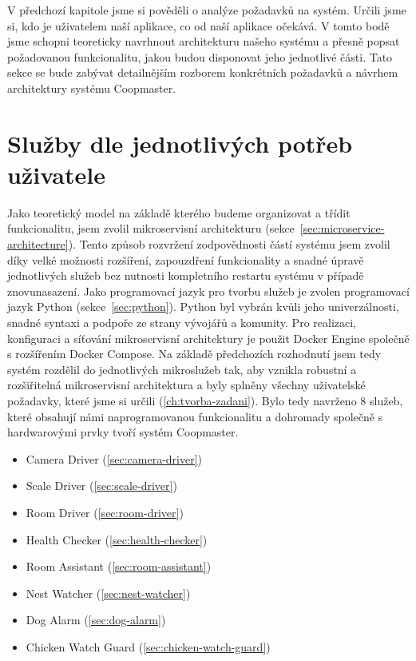V předchozí kapitole jsme si pověděli o analýze požadavků na systém.
Určili jsme si, kdo je uživatelem naší aplikace, co od naší aplikace očekává.
V tomto bodě jsme schopni teoreticky navrhnout architekturu našeho systému a přesně popsat požadovanou funkcionalitu, jakou budou disponovat jeho jednotlivé části.
Tato sekce se bude zabývat detailnějším rozborem konkrétních požadavků a návrhem architektury systému Coopmaster.

\clearpage
\section{Služby dle jednotlivých potřeb uživatele}\label{sec:microservices}
Jako teoretický model na základě kterého budeme organizovat a třídit funkcionalitu, jsem zvolil mikroservisní architekturu (sekce~\ref{sec:microservice-architecture}).
Tento způsob rozvržení zodpovědnosti částí systému jsem zvolil díky velké možnosti rozšíření, zapouzdření funkcionality a snadné úpravě jednotlivých služeb bez nutnosti kompletního restartu systému v případě znovunasazení.\newline
Jako programovací jazyk pro tvorbu služeb je zvolen programovací jazyk Python (sekce~\ref{sec:python}).
Python byl vybrán kvůli jeho univerzálnosti, snadné syntaxi a podpoře ze strany vývojářů a komunity.\newline
Pro realizaci, konfiguraci a síťování mikroservisní architektury je použit Docker Engine společně s rozšířením Docker Compose.\newline
Na základě předchozích rozhodnutí jsem tedy systém rozdělil do jednotlivých mikroslužeb tak, aby vznikla robustní a rozšiřitelná mikroservisní architektura a byly splněny všechny uživatelské požadavky, které jsme si určili (\ref{ch:tvorba-zadani}).\newline
Bylo tedy navrženo 8 služeb, které obsahují námi naprogramovanou funkcionalitu a dohromady společně s hardwarovými prvky tvoří systém Coopmaster.
\begin{itemize}
    \item Camera Driver (\ref{sec:camera-driver})
    \item Scale Driver (\ref{sec:scale-driver})
    \item Room Driver (\ref{sec:room-driver})
    \item Health Checker (\ref{sec:health-checker})
    \item Room Assistant (\ref{sec:room-assistant})
    \item Nest Watcher (\ref{sec:nest-watcher})
    \item Dog Alarm (\ref{sec:dog-alarm})
    \item Chicken Watch Guard (\ref{sec:chicken-watch-guard})
\end{itemize}

